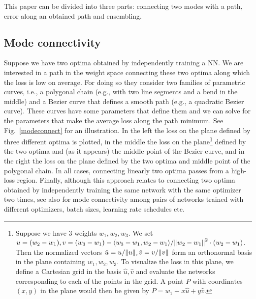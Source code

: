 This paper can be divided into three parts: connecting two modes with a path, error along an obtained path and ensembling. 

\subsection{Mode connectivity}
Suppose we have two optima obtained by independently training a NN. 
We are interested in a path in the weight space connecting these two optima along which the loss is low on average. 
For doing so they consider two families of parametric curves, i.e., a polygonal chain (e.g., with two line segments and a bend in the middle) and a Bezier curve that defines a smooth path (e.g., a quadratic Bezier curve).
These curves have some parameters that define them and we can solve for the parameters that make the average loss along the path minimum. 
See Fig.~\ref{modeconnect} for an illustration. 
In the left the loss on the plane defined by three different optima is plotted, in the middle the loss on the plane\footnote{Suppose we have 3 weights $w_1, w_2, w_3$. We set $u=(w_2-w_1), v=(w_3-w_1)-\langle w_3-w_1,w_2-w_1\rangle / \norm{w_2-w_1}^2\cdot(w_2-w_1)$. Then the normalized vectors $\hat{u}=u/\norm{u}, \hat{v}=v/\norm{v}$ form an orthonormal basis in the plane containing $w_1, w_2, w_3$. To visualize the loss in this plane, we define a Cartesian grid in the basis $\hat{u}, \hat{v}$ and evaluate the networks corresponding to each of the points in the grid. 
A point $P$ with coordinates $(x,y)$ in the plane would then be given by $P=w_1+x\hat{u}+y\hat{v}$.}
defined by the two optima and (as it appears) the middle point of the Bezier curve, and in the right the loss on the plane defined by the two optima and middle point of the polygonal chain.
In all cases, connecting linearly two optima passes from a high-loss region.
Finally, although this approach relates to connecting two optima obtained by independently training the same network with the same optimizer two times, see also \textcite{gotmare2018using} for mode connectivity among pairs of networks trained with different optimizers, batch sizes, learning rate schedules etc.
